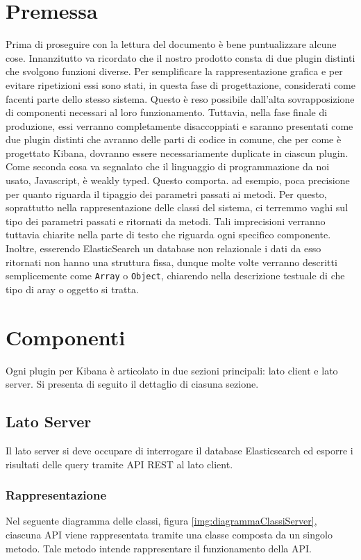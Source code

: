 
\section{Premessa}
Prima di proseguire con la lettura del documento è bene puntualizzare alcune cose.
Innanzitutto va ricordato che il nostro prodotto consta di due plugin distinti che svolgono funzioni diverse. Per semplificare la rappresentazione grafica e per evitare ripetizioni essi sono stati, in questa fase di progettazione, considerati come facenti parte dello stesso sistema. Questo è reso possibile dall'alta sovrapposizione di componenti necessari al loro funzionamento. Tuttavia, nella fase finale di produzione, essi verranno completamente disaccoppiati e saranno presentati come due plugin distinti che avranno delle parti di codice in comune, che per come è progettato Kibana, dovranno essere necessariamente duplicate in ciascun plugin.\\
Come seconda cosa va segnalato che il linguaggio di programmazione da noi usato, Javascript, è weakly typed. Questo comporta. ad esempio, poca precisione per quanto riguarda il tipaggio dei parametri passati ai metodi. Per questo, soprattutto nella rappresentazione delle classi del sistema, ci terremmo vaghi sul tipo dei parametri passati e ritornati da metodi. Tali imprecisioni verranno tuttavia chiarite nella parte di testo che riguarda ogni specifico componente. Inoltre, esserendo ElasticSearch un database non relazionale i dati da esso ritornati non hanno una struttura fissa, dunque molte volte verranno descritti semplicemente come \texttt{Array} o \texttt{Object}, chiarendo nella descrizione testuale di che tipo di aray o oggetto si tratta.

\section{Componenti}

Ogni plugin per Kibana è articolato in due sezioni principali: lato client e lato server. Si presenta di seguito il dettaglio di ciasuna sezione.

\subsection{Lato Server}
Il lato server si deve occupare di interrogare il database Elasticsearch ed esporre i risultati delle query tramite API REST al lato client.
\subsubsection{Rappresentazione}
Nel seguente diagramma delle classi, figura \ref{img:diagrammaClassiServer}, ciascuna API viene rappresentata tramite una classe composta da un singolo metodo. Tale metodo intende rappresentare il funzionamento della API.


